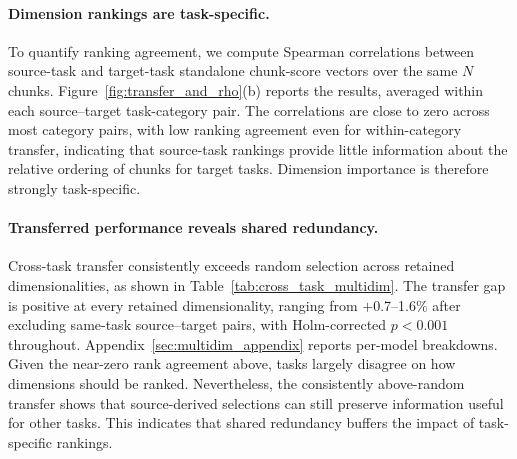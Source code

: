 \documentclass[11pt]{article}
\begin{document}
\paragraph{Dimension rankings are task-specific.}
To quantify ranking agreement, we compute Spearman correlations between source-task and target-task standalone chunk-score vectors over the same $N$ chunks. Figure~\ref{fig:transfer_and_rho}(b) reports the results, averaged within each source--target task-category pair. The correlations are close to zero across most category pairs, with low ranking agreement even for within-category transfer, indicating that source-task rankings provide little information about the relative ordering of chunks for target tasks. Dimension importance is therefore strongly task-specific.


\paragraph{Transferred performance reveals shared redundancy.}
Cross-task transfer consistently exceeds random selection across retained dimensionalities, as shown in Table~\ref{tab:cross_task_multidim}. The transfer gap is positive at every retained dimensionality, ranging from $+$0.7--1.6\% after excluding same-task source--target pairs, with Holm-corrected $p<0.001$ throughout. Appendix~\ref{sec:multidim_appendix} reports per-model breakdowns. Given the near-zero rank agreement above, tasks largely disagree on how dimensions should be ranked. Nevertheless, the consistently above-random transfer shows that source-derived selections can still preserve information useful for other tasks. This indicates that shared redundancy buffers the impact of task-specific rankings. 
\end{document}

